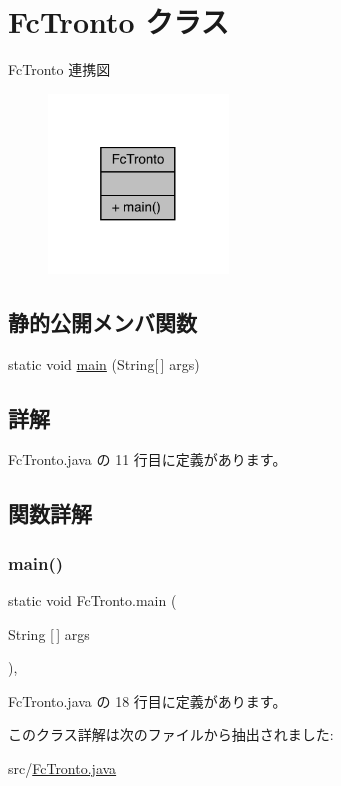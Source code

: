 \hypertarget{class_fc_tronto}{}\section{Fc\+Tronto クラス}
\label{class_fc_tronto}


Fc\+Tronto 連携図
\nopagebreak
\begin{figure}[H]
\begin{center}
\leavevmode
\includegraphics[width=136pt]{d4/df1/class_fc_tronto__coll__graph}
\end{center}
\end{figure}
\subsection*{静的公開メンバ関数}
\begin{DoxyCompactItemize}
\item 
static void \mbox{\hyperlink{class_fc_tronto_a3e0328e996d4755d3624e9217c5848dc}{main}} (String\mbox{[}$\,$\mbox{]} args)
\end{DoxyCompactItemize}


\subsection{詳解}


 Fc\+Tronto.\+java の 11 行目に定義があります。



\subsection{関数詳解}
\mbox{\label{class_fc_tronto_a3e0328e996d4755d3624e9217c5848dc}} 
\subsubsection{\texorpdfstring{main()}{main()}}
{\footnotesize\ttfamily static void Fc\+Tronto.\+main (\begin{DoxyParamCaption}\item[{String \mbox{[}$\,$\mbox{]}}]{args }\end{DoxyParamCaption})\hspace{0.3cm}{\ttfamily [inline]}, {\ttfamily [static]}}



 Fc\+Tronto.\+java の 18 行目に定義があります。



このクラス詳解は次のファイルから抽出されました\+:\begin{DoxyCompactItemize}
\item 
src/\mbox{\hyperlink{_fc_tronto_8java}{Fc\+Tronto.\+java}}\end{DoxyCompactItemize}
